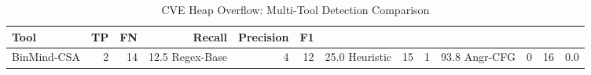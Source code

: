 \begin{table}[htbp]
\centering
\caption{CVE Heap Overflow: Multi-Tool Detection Comparison}
\label{tab:cve-multi-tool}
\begin{tabular}{lrrrrr}
\toprule
Tool & TP & FN & Recall & Precision & F1 \\
\midrule
BinMind-CSA & 2 & 14 & 12.5%
Regex-Base & 4 & 12 & 25.0%
Heuristic & 15 & 1 & 93.8%
Angr-CFG & 0 & 16 & 0.0%
\bottomrule
\end{tabular}
\end{table}
